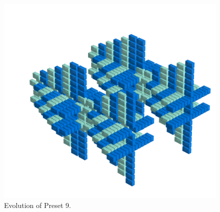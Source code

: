 \clearpage                                                                 
\begin{figure}[H]                                                          
  \centering                                                             
  \begin{adjustbox}{width=14cm,center}                                   
  \includegraphics[width=14cm]{src/presets/pattern9-45.png}%
  \end{adjustbox}                                                        
\caption{Evolution of Preset 9.}                                           
\end{figure}                                                               
\clearpage                                                                 
                                                                           
